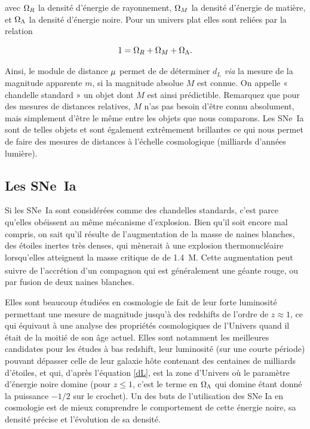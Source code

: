 \documentclass[a4paper, 12pt, svgnames]{article}
\begin{document}
avec $\Omega_R$ la densité d'énergie de rayonnement, $\Omega_M$ la densité d'énergie de
matière, et $\Omega_\Lambda$ la densité d'énergie noire. Pour un univers plat elles sont
reliées par la relation

\begin{equation}
    1 = \Omega_R + \Omega_M + \Omega_\Lambda.
\end{equation}

Ainsi, le module de distance $\mu$ permet de de déterminer $d_L$ \textit{via} la
mesure de la magnitude apparente $m$, si la magnitude absolue $M$ est connue.
On appelle « chandelle standard » un objet dont $M$ est ainsi prédictible.
Remarquez que pour des mesures de distances relatives, $M$ n'as pas besoin
d'être connu absolument, mais simplement d'être le même entre les objets que
nous comparons. Les SNe~Ia sont de telles objets et sont également extrêmement
brillantes ce qui nous permet de faire des mesures de distances à l'échelle
cosmologique (milliards d'années lumière).

\subsection{Les SNe~Ia}\label{ssec:sneia}
Si les SNe~Ia sont considérées comme des chandelles standards, c'est parce
qu'elles obéissent au même mécanisme d'explosion. Bien qu'il soit encore mal
compris, on sait qu'il résulte de l'augmentation de la masse de naines
blanches, des étoiles inertes très denses, qui mènerait à une explosion
thermonucléaire lorsqu'elles atteignent la masse critique de 
de \SI{1.4}{M_\odot}. Cette augmentation peut suivre de l'accrétion d'un
compagnon qui est généralement une géante rouge, ou par fusion de deux naines
blanches.

Elles sont beaucoup étudiées en cosmologie de fait de leur forte luminosité
permettant une mesure de magnitude jusqu'à des redshifts de l'ordre de $z
\approx 1$, ce qui équivaut à une analyse des propriétés cosmologiques de
l'Univers quand il était de la moitié de son âge actuel. Elles sont notamment
les meilleures candidates pour les études à bas redshift, leur luminosité (sur
une courte période) pouvant dépasser celle de leur galaxie hôte contenant des
centaines de milliards d'étoiles,  et qui, d'après l'équation \ref{dL}, est la
zone d'Univers où le paramètre d'énergie noire domine (pour $z \leq 1$, c'est le
terme en $\Omega_\Lambda$ qui domine étant donné la puissance $-1/2$ sur le crochet). Un
des buts de l'utilisation des SNe Ia en cosmologie est de mieux comprendre le
comportement de cette énergie noire, sa densité précise et l'évolution de sa
densité.
\end{document}
